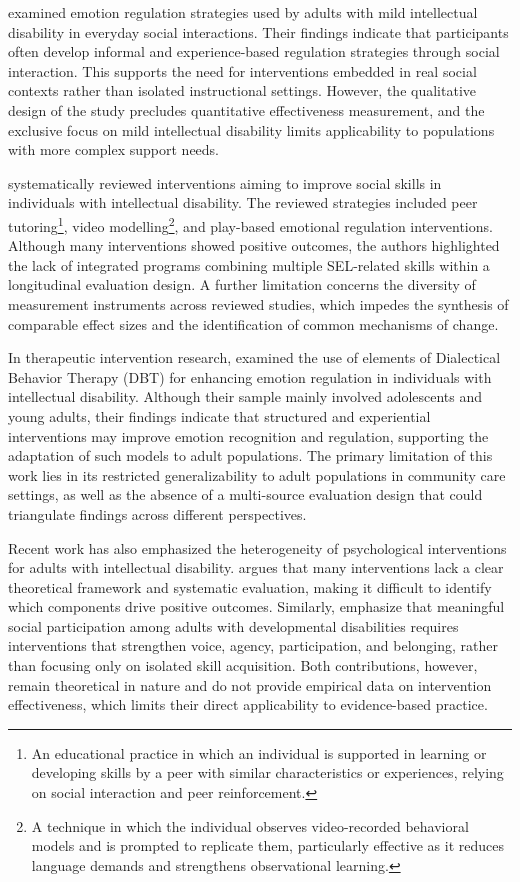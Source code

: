 \documentclass[12pt,a4paper]{article}
\begin{document}
\citet{littlewood2018} examined emotion regulation strategies used by adults with mild intellectual disability in everyday social interactions. Their findings indicate that participants often develop informal and experience-based regulation strategies through social interaction. This supports the need for interventions embedded in real social contexts rather than isolated instructional settings. However, the qualitative design of the study precludes quantitative effectiveness measurement, and the exclusive focus on mild intellectual disability limits applicability to populations with more complex support needs.

\citet{jacob2022} systematically reviewed interventions aiming to improve social skills in individuals with intellectual disability. The reviewed strategies included peer tutoring\footnote{An educational practice in which an individual is supported in learning or developing skills by a peer with similar characteristics or experiences, relying on social interaction and peer reinforcement.}, video modelling\footnote{A technique in which the individual observes video-recorded behavioral models and is prompted to replicate them, particularly effective as it reduces language demands and strengthens observational learning.}, and play-based emotional regulation interventions. Although many interventions showed positive outcomes, the authors highlighted the lack of integrated programs combining multiple SEL-related skills within a longitudinal evaluation design. A further limitation concerns the diversity of measurement instruments across reviewed studies, which impedes the synthesis of comparable effect sizes and the identification of common mechanisms of change.

In therapeutic intervention research, \citet{vanutelli2023} examined the use of elements of Dialectical Behavior Therapy (DBT) for enhancing emotion regulation in individuals with intellectual disability. Although their sample mainly involved adolescents and young adults, their findings indicate that structured and experiential interventions may improve emotion recognition and regulation, supporting the adaptation of such models to adult populations. The primary limitation of this work lies in its restricted generalizability to adult populations in community care settings, as well as the absence of a multi-source evaluation design that could triangulate findings across different perspectives.

Recent work has also emphasized the heterogeneity of psychological interventions for adults with intellectual disability. \citet{witwer2022} argues that many interventions lack a clear theoretical framework and systematic evaluation, making it difficult to identify which components drive positive outcomes. Similarly, \citet{mcnaughton2025} emphasize that meaningful social participation among adults with developmental disabilities requires interventions that strengthen voice, agency, participation, and belonging, rather than focusing only on isolated skill acquisition. Both contributions, however, remain theoretical in nature and do not provide empirical data on intervention effectiveness, which limits their direct applicability to evidence-based practice.
\end{document}
